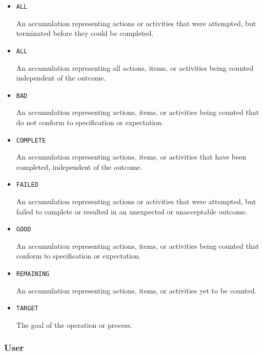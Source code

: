 \begin{itemize}

\item \texttt{ALL}


An accumulation representing actions or activities that were attempted, but terminated before they could be completed.

\item \texttt{ALL}


An accumulation representing all actions, items, or activities being counted independent of the outcome.

\item \texttt{BAD}


An accumulation representing actions, items, or activities being counted that do not conform to specification or expectation.

\item \texttt{COMPLETE}


An accumulation representing actions, items, or activities that have been completed, independent of the outcome.

\item \texttt{FAILED}


An accumulation representing actions or activities that were attempted, but failed to
complete or resulted in an unexpected or unacceptable outcome.

\item \texttt{GOOD}


An accumulation representing actions, items, or activities being counted that conform to specification or expectation.

\item \texttt{REMAINING}


An accumulation representing actions, items, or activities yet to be counted.

\item \texttt{TARGET}


The goal of the operation or process.


\end{itemize}











\subsubsection{User}
\label{sec:User}



